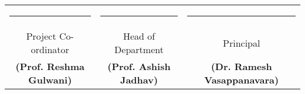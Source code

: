 \vspace{-0.2in}
\begin{center}
\begin{tabular}{ccc}

      \noindent\rule{4cm}{0.5pt} & \hspace{0.5in}\noindent\rule{4cm}{0.5pt} & \hspace{0.12in}\noindent\rule{4cm}{0.5pt} \\
      \small{Project Co-ordinator} & \hspace{0.5in}\small{Head of Department} & \hspace{0.12in}\small{Principal} \\
   \small{\textbf{(Prof. Reshma Gulwani)}}& \hspace{0.5in}\small{\textbf{(Prof. Ashish Jadhav)}} & \hspace{0.25in}\small{\textbf{(Dr. Ramesh Vasappanavara)}} \\
    \end{tabular}
\end{center}
